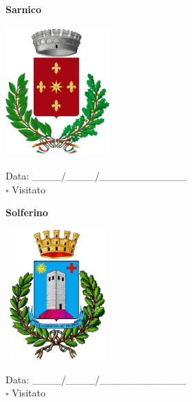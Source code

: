 \documentclass[a5paper,12pt]{article}
\begin{document}
\vspace{0.7cm}

\noindent
\begin{minipage}[t]{0.45\textwidth}
    \begin{center}
        \textbf{Sarnico}
    \end{center}
    \vspace{-0.5cm} %
    \begin{center}
        \includegraphics[height= 5cm, width=4cm]{Lombardia/Stemma Sarnico.png}
    \end{center}
    \vspace{-0.4cm} %
    \begin{flushleft}
        Data: \_\_\_\_/\_\_\_\_/\_\_\_\_\_\_\_\_\_\_\_\_ \\
        $\square$ Visitato
    \end{flushleft}
\end{minipage}
\hfill
\noindent
\begin{minipage}[t]{0.45\textwidth}
    \begin{center}
        \textbf{Solferino}
    \end{center}
    \vspace{-0.5cm} %
    \begin{center}
        \includegraphics[height= 5cm, width=4cm]{Lombardia/Stemma Solferino.png}
    \end{center}
    \vspace{-0.4cm} %
    \begin{flushleft}
        Data: \_\_\_\_/\_\_\_\_/\_\_\_\_\_\_\_\_\_\_\_\_ \\
        $\square$ Visitato
    \end{flushleft}
\end{minipage}
\end{document}
